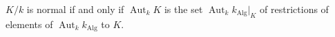 $K/k$ is normal if and only if $\operatorname{Aut}_k K$ is the set $\operatorname{Aut}_k k_{\text{Alg}}|_K$ of restrictions of elements of $\operatorname{Aut}_k k_{\text{Alg}}$ to $K$.
